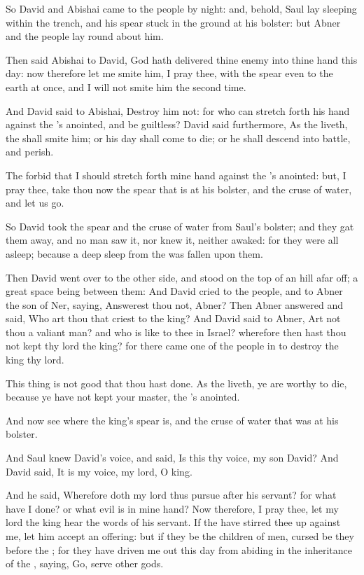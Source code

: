 \Verse So David and Abishai came to the people by night: and, behold, Saul lay sleeping within the trench, and his spear stuck in the ground at his bolster: but Abner and the people lay round about him.

\Verse Then said Abishai to David, God hath delivered thine enemy into thine hand this day: now therefore let me smite him, I pray thee, with the spear even to the earth at once, and I will not smite him the second time.

\Verse And David said to Abishai, Destroy him not: for who can stretch forth his hand against the \LORD's anointed, and be guiltless?  \Verse David said furthermore, As the \LORD liveth, the \LORD shall smite him; or his day shall come to die; or he shall descend into battle, and perish.

\Verse The \LORD forbid that I should stretch forth mine hand against the \LORD's anointed: but, I pray thee, take thou now the spear that is at his bolster, and the cruse of water, and let us go.

\Verse So David took the spear and the cruse of water from Saul's bolster; and they gat them away, and no man saw it, nor knew it, neither awaked: for they were all asleep; because a deep sleep from the \LORD was fallen upon them.

\Verse Then David went over to the other side, and stood on the top of an hill afar off; a great space being between them: \Verse And David cried to the people, and to Abner the son of Ner, saying, Answerest thou not, Abner? Then Abner answered and said, Who art thou that criest to the king?  \Verse And David said to Abner, Art not thou a valiant man? and who is like to thee in Israel? wherefore then hast thou not kept thy lord the king? for there came one of the people in to destroy the king thy lord.

\Verse This thing is not good that thou hast done. As the \LORD liveth, ye are worthy to die, because ye have not kept your master, the \LORD's anointed.

And now see where the king's spear is, and the cruse of water that was at his bolster.

\Verse And Saul knew David's voice, and said, Is this thy voice, my son David? And David said, It is my voice, my lord, O king.

\Verse And he said, Wherefore doth my lord thus pursue after his servant?  for what have I done? or what evil is in mine hand?  \Verse Now therefore, I pray thee, let my lord the king hear the words of his servant. If the \LORD have stirred thee up against me, let him accept an offering: but if they be the children of men, cursed be they before the \LORD; for they have driven me out this day from abiding in the inheritance of the \LORD, saying, Go, serve other gods.

